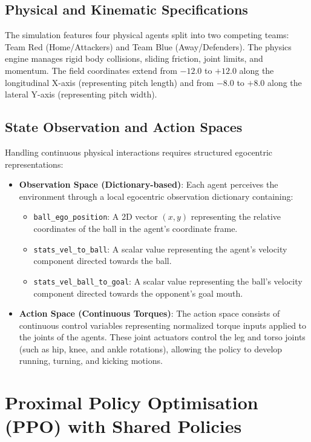 \subsection{Physical and Kinematic Specifications}
The simulation features four physical agents split into two competing teams: Team Red (Home/Attackers) and Team Blue (Away/Defenders). The physics engine manages rigid body collisions, sliding friction, joint limits, and momentum. The field coordinates extend from $-12.0$ to $+12.0$ along the longitudinal X-axis (representing pitch length) and from $-8.0$ to $+8.0$ along the lateral Y-axis (representing pitch width).

\subsection{State Observation and Action Spaces}
Handling continuous physical interactions requires structured egocentric representations:
\begin{itemize}
    \item \textbf{Observation Space (Dictionary-based)}: Each agent perceives the environment through a local egocentric observation dictionary containing:
    \begin{itemize}
        \item \texttt{ball\_ego\_position}: A 2D vector $(x, y)$ representing the relative coordinates of the ball in the agent's coordinate frame.
        \item \texttt{stats\_vel\_to\_ball}: A scalar value representing the agent's velocity component directed towards the ball.
        \item \texttt{stats\_vel\_ball\_to\_goal}: A scalar value representing the ball's velocity component directed towards the opponent's goal mouth.
    \end{itemize}
    \item \textbf{Action Space (Continuous Torques)}: The action space consists of continuous control variables representing normalized torque inputs applied to the joints of the agents. These joint actuators control the leg and torso joints (such as hip, knee, and ankle rotations), allowing the policy to develop running, turning, and kicking motions.
\end{itemize}

\section{Proximal Policy Optimisation (PPO) with Shared Policies}
\label{sec:method_ppo}

